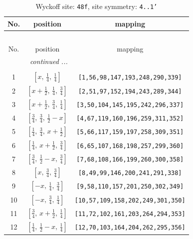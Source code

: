 \documentclass[fleqn,8pt]{jsarticle}
\begin{document}
\begin{longtable}{ccc}
\caption{Wyckoff site: {\tt 48f}, site symmetry: {\tt 4..1'}}
 \\
 \hline \hline
No. & position & mapping \\ \hline \endfirsthead

\multicolumn{2}{l}{\tablename\ \thetable{}} \\
 \hline \hline
No. & position & mapping \\ \hline \endhead

 \hline \hline
\multicolumn{2}{r}{\footnotesize\it continued ...} \\ \endfoot

 \hline \hline
\multicolumn{2}{r}{} \\ \endlastfoot

1 & $\left[ x,\, \frac{1}{4},\, \frac{1}{4} \right]$ & {\tt [1,56,98,147,193,248,290,339]} \\ \hline
2 & $\left[ x + \frac{1}{2},\, \frac{1}{4},\, \frac{3}{4} \right]$ & {\tt [2,51,97,152,194,243,289,344]} \\ \hline
3 & $\left[ x + \frac{1}{2},\, \frac{3}{4},\, \frac{1}{4} \right]$ & {\tt [3,50,104,145,195,242,296,337]} \\ \hline
4 & $\left[ \frac{3}{4},\, \frac{3}{4},\, \frac{1}{2} - x \right]$ & {\tt [4,67,119,160,196,259,311,352]} \\ \hline
5 & $\left[ \frac{1}{4},\, \frac{3}{4},\, x + \frac{1}{2} \right]$ & {\tt [5,66,117,159,197,258,309,351]} \\ \hline
6 & $\left[ \frac{1}{4},\, x + \frac{1}{2},\, \frac{3}{4} \right]$ & {\tt [6,65,107,168,198,257,299,360]} \\ \hline
7 & $\left[ \frac{3}{4},\, \frac{1}{2} - x,\, \frac{3}{4} \right]$ & {\tt [7,68,108,166,199,260,300,358]} \\ \hline
8 & $\left[ x,\, \frac{3}{4},\, \frac{3}{4} \right]$ & {\tt [8,49,99,146,200,241,291,338]} \\ \hline
9 & $\left[ - x,\, \frac{1}{4},\, \frac{3}{4} \right]$ & {\tt [9,58,110,157,201,250,302,349]} \\ \hline
10 & $\left[ - x,\, \frac{3}{4},\, \frac{1}{4} \right]$ & {\tt [10,57,109,158,202,249,301,350]} \\ \hline
11 & $\left[ \frac{3}{4},\, x + \frac{1}{2},\, \frac{1}{4} \right]$ & {\tt [11,72,102,161,203,264,294,353]} \\ \hline
12 & $\left[ \frac{1}{4},\, \frac{1}{2} - x,\, \frac{1}{4} \right]$ & {\tt [12,70,103,164,204,262,295,356]} \\ \hline

\end{longtable}
\end{document}
